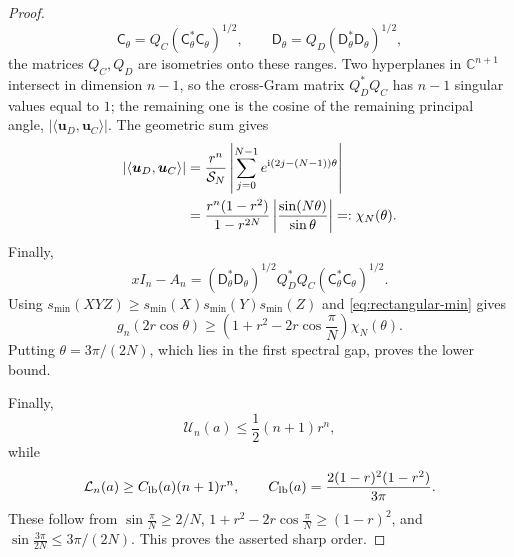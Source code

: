 \documentclass[review,hidelinks,onefignum,onetabnum]{siamart251216}
\newcommand{\C}{\mathbb C}
\newcommand{\ii}{\mathrm i}
\begin{document}
\begin{proof}
\[
 \mathsf{C}_\theta=Q_C(\mathsf{C}_\theta^*\mathsf{C}_\theta)^{1/2},
 \qquad
 \mathsf{D}_\theta=Q_D(\mathsf{D}_\theta^*\mathsf{D}_\theta)^{1/2},
\]
the matrices \(Q_C,Q_D\) are isometries onto these ranges.  Two
hyperplanes in \(\C^{n+1}\) intersect in dimension \(n-1\), so
the cross-Gram matrix \(Q_D^*Q_C\) has \(n-1\) singular values equal to
\(1\); the remaining one is the cosine of the remaining principal
angle, \(|\langle\boldsymbol u_D,\boldsymbol u_C\rangle|\).  The
geometric sum gives
\begin{align}
 |\langle\boldsymbol u_D,\boldsymbol u_C\rangle|
 &=\frac{r^n}{\mathcal S_N}
 \left|\sum_{j=0}^{N-1}e^{\ii(2j-(N-1))\theta}\right|\notag\\
 &=
 \frac{r^n(1-r^2)}{1-r^{2N}}
 \left|\frac{\sin(N\theta)}{\sin\theta}\right|
 =:\chi_N(\theta).
\label{eq:chi}
\end{align}
Finally,
\[
 xI_n-A_n=(\mathsf{D}_\theta^*\mathsf{D}_\theta)^{1/2}
 Q_D^*Q_C(\mathsf{C}_\theta^*\mathsf{C}_\theta)^{1/2}.
\]
Using \(s_{\min}(XYZ)\geq
s_{\min}(X)s_{\min}(Y)s_{\min}(Z)\) and
\eqref{eq:rectangular-min} gives
\[
 g_n(2r\cos\theta)\geq
 \left(1+r^2-2r\cos\frac{\pi}{N}\right)\chi_N(\theta).
\]
Putting \(\theta=3\pi/(2N)\), which lies in the first spectral gap,
proves the lower bound.

Finally,
\[
 \mathcal U_n(a)\leq\frac12(n+1)r^n,
\]
while
\begin{equation}\label{eq:L-simple}
 \mathcal L_n(a)\geq C_{\rm lb}(a)(n+1)r^n,\qquad
 C_{\rm lb}(a)=\frac{2(1-r)^2(1-r^2)}{3\pi}.
\end{equation}
These follow from
\(\sin\frac{\pi}{N}\geq2/N\),
\(1+r^2-2r\cos\frac{\pi}{N}\geq(1-r)^2\), and
\(\sin\frac{3\pi}{2N}\leq3\pi/(2N)\).  This proves the asserted sharp
order.
\end{proof}
\end{document}
